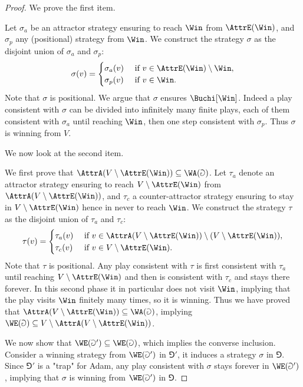 \begin{proof}
We prove the first item. 

Let $\sigma_a$ be an attractor strategy ensuring to reach $\Win$ from $\AttrE(\Win)$, and $\sigma_p$ any (positional) strategy from $\Win$.
We construct the strategy $\sigma$ as the disjoint union of $\sigma_a$ and $\sigma_p$:
\[
\sigma(v) = 
\begin{cases}
\sigma_a(v) & \text{ if } v \in \AttrE(\Win) \setminus \Win, \\
\sigma_p(v) & \text{ if } v \in \Win.
\end{cases}
\]
Note that $\sigma$ is positional.
We argue that $\sigma$ ensures $\Buchi[\Win]$.
Indeed a play consistent with $\sigma$ can be divided into infinitely many finite plays,
each of them consistent with $\sigma_a$ until reaching $\Win$,
then one step consistent with $\sigma_p$.
Thus $\sigma$ is winning from $V$.

We now look at the second item.

We first prove that $\AttrA(V \setminus \AttrE(\Win)) \subseteq \WA(\Game)$.
Let $\tau_a$ denote an attractor strategy ensuring to reach $V \setminus \AttrE(\Win)$ from $\AttrA(V \setminus \AttrE(\Win))$,
and $\tau_c$ a counter-attractor strategy ensuring to stay in $V \setminus \AttrE(\Win)$ hence in never to reach $\Win$.
We construct the strategy $\tau$ as the disjoint union of $\tau_a$ and $\tau_c$:
\[
\tau(v) = 
\begin{cases}
\tau_a(v) & \text{ if } v \in \AttrA(V \setminus \AttrE(\Win)) \setminus (V \setminus \AttrE(\Win)), \\
\tau_c(v) & \text{ if } v \in V \setminus \AttrE(\Win).
\end{cases}
\]
Note that $\tau$ is positional.
Any play consistent with $\tau$ is first consistent with $\tau_a$ until reaching $V \setminus \AttrE(\Win)$ and 
then is consistent with $\tau_c$ and stays there forever.
In this second phase it in particular does not visit $\Win$, 
implying that the play visits $\Win$ finitely many times, so it is winning.
Thus we have proved that $\AttrA(V \setminus \AttrE(\Win)) \subseteq \WA(\Game)$,
implying $\WE(\Game) \subseteq V \setminus \AttrA(V \setminus \AttrE(\Win))$.

We now show that $\WE(\Game') \subseteq \WE(\Game)$, which implies the converse inclusion.
Consider a winning strategy from $\WE(\Game')$ in $\Game'$, it induces a strategy $\sigma$ in $\Game$.
Since $\Game'$ is a "trap" for Adam, any play consistent with $\sigma$ stays forever in $\WE(\Game')$, 
implying that $\sigma$ is winning from $\WE(\Game')$ in $\Game$.
\end{proof}


